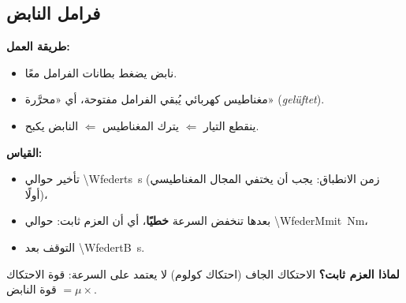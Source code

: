 \documentclass[11pt,a4paper]{article}
\newcommand{\de}[1]{(\textgerman{\itshape #1})}
\begin{document}
\subsection{فرامل النابض}
\textbf{طريقة العمل:}
\begin{itemize}
\item نابض يضغط بطانات الفرامل معًا.
\item مغناطيس كهربائي يُبقي الفرامل مفتوحة، أي «محرَّرة» \de{gelüftet}.
\item ينقطع التيار $\Leftarrow$ يترك المغناطيس $\Leftarrow$ النابض يكبح.
\end{itemize}
\textbf{القياس:}
\begin{itemize}
\item تأخير حوالي \SI{\Wfederts}{s} (زمن الانطباق: يجب أن يختفي المجال المغناطيسي أولًا)،
\item بعدها تنخفض السرعة \textbf{خطيًا}، أي أن العزم ثابت: حوالي \SI{\WfederMmit}{Nm}،
\item التوقف بعد \SI{\WfedertB}{s}.
\end{itemize}
\textbf{لماذا العزم ثابت؟} الاحتكاك الجاف (احتكاك كولوم) لا يعتمد على السرعة:
قوة الاحتكاك $=\mu\times$ قوة النابض.
\end{document}
